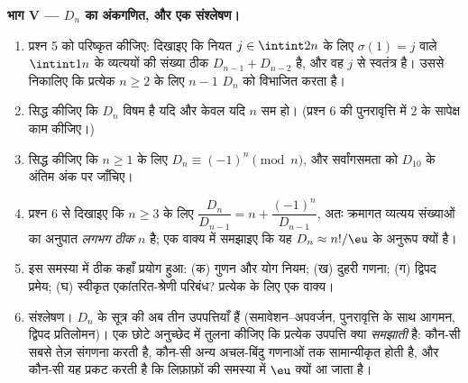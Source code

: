 \begin{problem}
\medskip \noindent\textbf{भाग V --- $D_n$ का अंकगणित, और एक संश्लेषण।}
\begin{enumerate}[resume]
  \item प्रश्न 5 को परिष्कृत कीजिए: दिखाइए कि नियत $j \in \intint2n$ के लिए
  $\sigma(1) = j$ वाले $\intint1n$ के व्यत्ययों की संख्या ठीक $D_{n-1} +
  D_{n-2}$ है, और वह $j$ से स्वतंत्र है। उससे निकालिए कि प्रत्येक $n \geq 2$
  के लिए $n - 1$ $D_n$ को विभाजित करता है।
  \item सिद्ध कीजिए कि $D_n$ विषम है यदि और केवल यदि $n$ सम हो। (प्रश्न 6 की
  पुनरावृत्ति में $2$ के सापेक्ष काम कीजिए।)
  \item सिद्ध कीजिए कि $n \geq 1$ के लिए $D_n \equiv (-1)^n \pmod n$, और
  सर्वांगसमता को $D_{10}$ के अंतिम अंक पर जाँचिए।
  \item प्रश्न 6 से दिखाइए कि $n \geq 3$ के लिए $\dfrac{D_n}{D_{n-1}} = n +
  \dfrac{(-1)^n}{D_{n-1}}$, अतः क्रमागत व्यत्यय संख्याओं का अनुपात
  \emph{लगभग ठीक} $n$ है; एक वाक्य में समझाइए कि यह $D_n \approx n!/\eu$ के
  अनुरूप क्यों है।
  \item इस समस्या में ठीक कहाँ प्रयोग हुआ: (क) गुणन और योग नियम; (ख) दुहरी
  गणना; (ग) द्विपद प्रमेय; (घ) स्वीकृत एकांतरित-श्रेणी परिबंध? प्रत्येक के
  लिए एक वाक्य।
  \item संश्लेषण। $D_n$ के सूत्र की अब तीन उपपत्तियाँ हैं (समावेशन--अपवर्जन,
  पुनरावृत्ति के साथ आगमन, द्विपद प्रतिलोमन)। एक छोटे अनुच्छेद में तुलना
  कीजिए कि प्रत्येक उपपत्ति क्या \emph{समझाती} है: कौन-सी सबसे तेज़ संगणना
  करती है, कौन-सी अन्य अचल-बिंदु गणनाओं तक सामान्यीकृत होती है, और कौन-सी यह
  प्रकट करती है कि लिफ़ाफ़ों की समस्या में $\eu$ क्यों आ जाता है।
\end{enumerate}
\end{problem}
